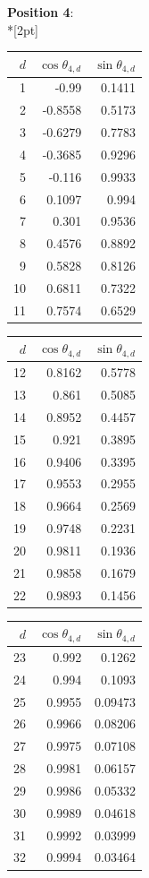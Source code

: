 \noindent \textbf{Position 4}:\\*[2pt]
{\tablefont \begin{tabular}[t]{r|rr}
$d$ & $\cos\theta_{4,d}$ & $\sin\theta_{4,d}$ \\\hline
1 & -0.99 & 0.1411 \\
2 & -0.8558 & 0.5173 \\
3 & -0.6279 & 0.7783 \\
4 & -0.3685 & 0.9296 \\
5 & -0.116 & 0.9933 \\
6 & 0.1097 & 0.994 \\
7 & 0.301 & 0.9536 \\
8 & 0.4576 & 0.8892 \\
9 & 0.5828 & 0.8126 \\
10 & 0.6811 & 0.7322 \\
11 & 0.7574 & 0.6529
\end{tabular}\kern4pt
\begin{tabular}[t]{r|rr}
$d$ & $\cos\theta_{4,d}$ & $\sin\theta_{4,d}$ \\\hline
12 & 0.8162 & 0.5778 \\
13 & 0.861 & 0.5085 \\
14 & 0.8952 & 0.4457 \\
15 & 0.921 & 0.3895 \\
16 & 0.9406 & 0.3395 \\
17 & 0.9553 & 0.2955 \\
18 & 0.9664 & 0.2569 \\
19 & 0.9748 & 0.2231 \\
20 & 0.9811 & 0.1936 \\
21 & 0.9858 & 0.1679 \\
22 & 0.9893 & 0.1456
\end{tabular}\kern4pt
\begin{tabular}[t]{r|rr}
$d$ & $\cos\theta_{4,d}$ & $\sin\theta_{4,d}$ \\\hline
23 & 0.992 & 0.1262 \\
24 & 0.994 & 0.1093 \\
25 & 0.9955 & 0.09473 \\
26 & 0.9966 & 0.08206 \\
27 & 0.9975 & 0.07108 \\
28 & 0.9981 & 0.06157 \\
29 & 0.9986 & 0.05332 \\
30 & 0.9989 & 0.04618 \\
31 & 0.9992 & 0.03999 \\
32 & 0.9994 & 0.03464 \\

\end{tabular}}
